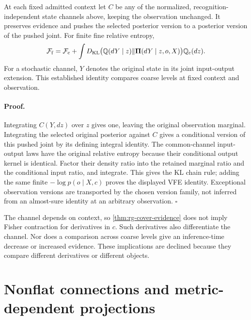 At each fixed admitted context let \(C\) be any of the normalized,
recognition-independent state channels above, keeping the observation
unchanged. It preserves evidence and pushes the selected posterior version
to a posterior version of the pushed joint. For finite fine relative entropy,
\begin{equation}
 \mathcal F_{\mathrm f}=\mathcal F_{\mathrm c}
 +\int D_{\mathrm{KL}}\bigl(\mathbb Q(dY\mid z)\Vert
                  \boldsymbol\Pi(dY\mid z,o,X)\bigr)
          \mathbb Q_{\mathrm c}(dz).
\label{eq:rg-cover-vfe-disintegration}
\end{equation}
For a stochastic channel, \(Y\) denotes the original state in its joint
input-output extension. This established identity compares coarse levels at
fixed context and observation. 

\paragraph{Proof.}
Integrating \(C(Y,dz)\) over \(z\) gives one, leaving the original
observation marginal. Integrating the selected original posterior against
\(C\) gives a conditional version of this pushed joint by its defining
integral identity. The common-channel input-output laws have the original
relative entropy because their conditional output kernel is identical.
Factor their density ratio into the retained marginal ratio and the
conditional input ratio, and integrate. This gives the KL chain rule;
adding the same finite \(-\log p(o\mid X,c)\) proves the displayed VFE
identity. Exceptional observation versions are transported by the chosen
version family, not inferred from an almost-sure identity at an arbitrary
observation. \(\square\)

The channel depends on context, so \cref{thm:rg-cover-evidence} does not
imply Fisher contraction for derivatives in \(c\). Such derivatives also
differentiate the channel. Nor does a comparison across coarse levels give
an inference-time decrease or increased evidence. These implications are
declined because they compare different derivatives or different objects.

\section{Nonflat connections and metric-dependent projections}
\label{sec:rg-cover-connections}

